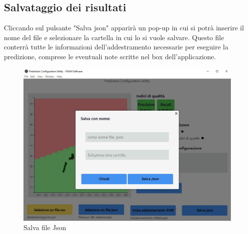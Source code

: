 	\subsection{Salvataggio dei risultati}
	Cliccando sul pulsante "Salva json" apparirà un pop-up in cui si potrà inserire il nome del file e selezionare la cartella in cui lo si vuole salvare. Questo file conterrà tutte le informazioni dell'addestramento necessarie per eseguire la predizione, comprese le eventuali note scritte nel box dell'applicazione.
	\begin{figure}[H] 	
		\begin{center}
			\includegraphics[width=\linewidth]{img/10.jpg}
		\end{center}
		\caption{Salva file Json}	
	\end{figure}
	
